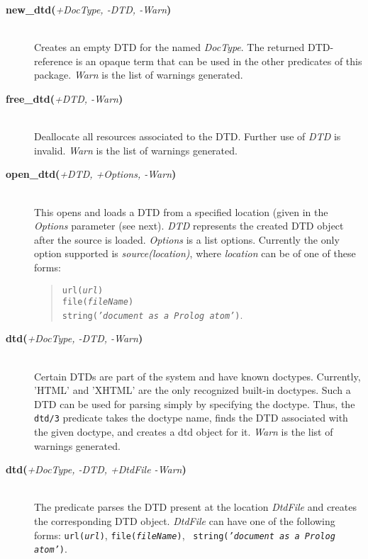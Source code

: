 \begin{description}
\item[{\bf new\_dtd}{\bf (}{\it +DocType, -DTD, -Warn}{\bf )}]\mbox{}\\Creates an empty DTD for the named {\it DocType}. The returned 
  DTD-reference is an opaque term that can be used in the other predicates
  of this package. {\it Warn} is the list of warnings generated.

\item[{\bf free\_dtd}{\bf (}{\it +DTD, -Warn}{\bf )}]\mbox{}\\
  Deallocate all resources associated to the DTD. Further use of {\it DTD}
  is invalid. {\it Warn} is the list of warnings generated.

\item[{\bf open\_dtd}{\bf (}{\it +DTD, +Options, -Warn}{\bf )}]\mbox{}\\
   This opens and loads a DTD from a specified location (given in the
   \emph{Options} parameter (see next).
   {\it DTD} represents the created DTD object after the source is loaded.
   {\it Options} is a list options. Currently the only option supported is
   {\it source(location)}, where {\it location} can be of one of these
   forms:
   \begin{quote}
     {\tt url({\it {url}})}\\
     {\tt file({\it fileName})}\\
     {\tt string({\it 'document as a Prolog atom'})}.
   \end{quote}
 

\item[{\bf dtd}{\bf (}{\it +DocType, -DTD, -Warn}{\bf )}]\mbox{}\\
  Certain DTDs are part of the system and have known
  doctypes. Currently, 'HTML' and 'XHTML' are the only recognized built-in
  doctypes.
  Such a DTD can be used for parsing simply by
  specifying the doctype.  Thus, the {\tt dtd/3} predicate takes the
  doctype name, finds the DTD associated with the given doctype, and
  creates a dtd object for it.  {\it Warn} is the list of warnings
  generated.

\item[{\bf dtd}{\bf (}{\it +DocType, -DTD, +DtdFile -Warn}{\bf )}]\mbox{}\\
  
  The predicate parses the DTD present at the location \emph{DtdFile} and
  creates the corresponding DTD object.  {\it DtdFile} can have one of the
  following forms: {\tt url({\it url})}, {\tt file({\it fileName})}, {\tt
    string({\it 'document as a Prolog atom'})}.

\end{description}


